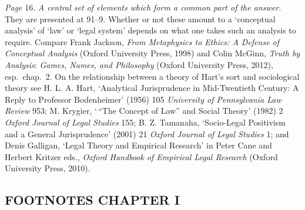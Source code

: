 \documentclass[12pt,oneside]{book}  %
\begin{document}
\emph{Page} 16. \emph{A central set of elements which form a common part
of the answer.} They are presented at 91--9. Whether or not these amount
to a `conceptual analysis' of `law' or `legal system' depends on what
one takes such an analysis to require. Compare Frank Jackson, \emph{From
Metaphysics to Ethics: A Defense of Conceptual Analysis} (Oxford
University Press, 1998) and Colin McGinn, \emph{Truth by Analysis}:
\emph{Games, Names, and Philosophy} (Oxford University Press, 2012),
esp.~chap.~2. On the relationship between a theory of Hart's sort and
sociological theory see H. L. A. Hart, `Analytical Jurisprudence in
Mid-Twentieth Century: A Reply to Professor Bodenheimer' (1956) 105
\emph{University of Pennsylvania Law Review} 953; M. Krygier, `\,``The
Concept of Law'' and Social Theory' (1982) 2 \emph{Oxford Journal of
Legal Studies} 155; B. Z. Tamanaha, `Socio-Legal Positivism and a
General Jurisprudence' (2001) 21 \emph{Oxford Journal of Legal Studies}
1; and Denis Galligan, `Legal Theory and Empirical Research' in Peter
Cane and Herbert Kritzer eds., \emph{Oxford Handbook of Empirical Legal
Research} (Oxford University Press, 2010).

\subsection{FOOTNOTES CHAPTER
I}\label{footnotes-chapter-i}  %
\end{document}

